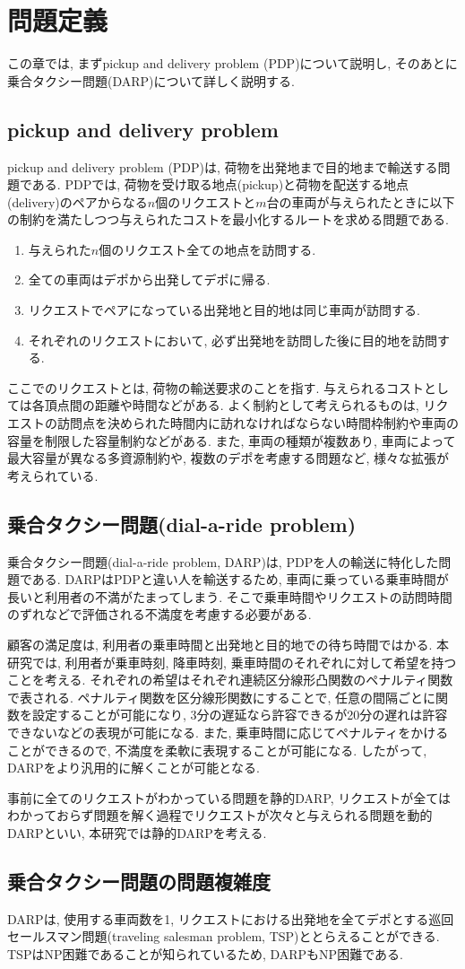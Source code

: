 \chapter{問題定義}\label{definition}
この章では, まずpickup and delivery problem (PDP)について説明し, そのあとに乗合タクシー問題(DARP)について詳しく説明する. 
\section{pickup and delivery problem}
pickup and delivery problem (PDP)は, 荷物を出発地まで目的地まで輸送する問題である. PDPでは, 荷物を受け取る地点(pickup)と荷物を配送する地点(delivery)のペアからなる$n$個のリクエストと$m$台の車両が与えられたときに以下の制約を満たしつつ与えられたコストを最小化するルートを求める問題である. 
\begin{enumerate}
 \item 与えられた$n$個のリクエスト全ての地点を訪問する. 
 \item 全ての車両はデポから出発してデポに帰る. 
 \item リクエストでペアになっている出発地と目的地は同じ車両が訪問する.
 \item それぞれのリクエストにおいて, 必ず出発地を訪問した後に目的地を訪問する.
\end{enumerate}
ここでのリクエストとは, 荷物の輸送要求のことを指す.
与えられるコストとしては各頂点間の距離や時間などがある. よく制約として考えられるものは, リクエストの訪問点を決められた時間内に訪れなければならない時間枠制約や車両の容量を制限した容量制約などがある. また, 車両の種類が複数あり, 車両によって最大容量が異なる多資源制約や, 複数のデポを考慮する問題など, 様々な拡張が考えられている. 

\section{乗合タクシー問題(dial-a-ride problem)}
乗合タクシー問題(dial-a-ride problem, DARP)は, PDPを人の輸送に特化した問題である. DARPはPDPと違い人を輸送するため, 車両に乗っている乗車時間が長いと利用者の不満がたまってしまう. そこで乗車時間やリクエストの訪問時間のずれなどで評価される不満度を考慮する必要がある.

顧客の満足度は, 利用者の乗車時間と出発地と目的地での待ち時間ではかる. 本研究では, 利用者が乗車時刻, 降車時刻, 乗車時間のそれぞれに対して希望を持つことを考える. それぞれの希望はそれぞれ連続区分線形凸関数のペナルティ関数で表される. ペナルティ関数を区分線形関数にすることで, 任意の間隔ごとに関数を設定することが可能になり, 3分の遅延なら許容できるが20分の遅れは許容できないなどの表現が可能になる. また, 乗車時間に応じてペナルティをかけることができるので, 不満度を柔軟に表現することが可能になる. したがって, DARPをより汎用的に解くことが可能となる.

事前に全てのリクエストがわかっている問題を静的DARP, リクエストが全てはわかっておらず問題を解く過程でリクエストが次々と与えられる問題を動的DARPといい, 本研究では静的DARPを考える. 

\section{乗合タクシー問題の問題複雑度}
DARPは, 使用する車両数を1, リクエストにおける出発地を全てデポとする巡回セールスマン問題(traveling salesman problem, TSP)ととらえることができる. TSPはNP困難\cite{TSP}であることが知られているため, DARPもNP困難である.
